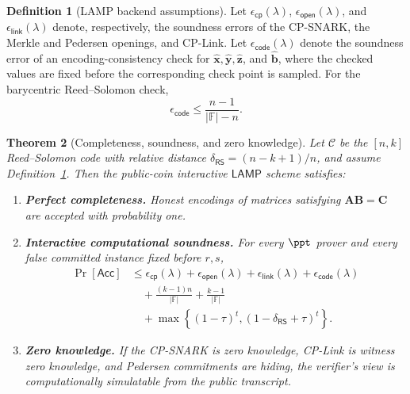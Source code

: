 \documentclass[conference,compsoc]{IEEEtran}
\newif\ifshowrevisions
\newenvironment{revblock}[1][]
  {%
    \ifshowrevisions
      \begin{tcolorbox}[
        breakable,
        colback=revisionyellow,
        colframe=revisionyellow,
        boxrule=0pt,
        arc=0pt,
        left=2pt,
        right=2pt,
        top=2pt,
        bottom=2pt,
        before skip=2pt,
        after skip=2pt,
        #1
      ]
    \fi
  }
  {%
    \ifshowrevisions
      \end{tcolorbox}
    \fi
  }
\newcommand{\mat}{\mathbf}          %
\newcommand{\vect}{\mathbf}         %
\newcommand{\protocol}{\textsf{LAMP}}   %
\theoremstyle{plain}
\newtheorem{theorem}{Theorem}[section]
\theoremstyle{definition}
\newtheorem{definition}[theorem]{Definition}
\theoremstyle{remark}
\begin{document}
\begin{revblock}
\begin{definition}[LAMP backend assumptions]
\label{def:lamp-backend-assumptions}
Let \(\epsilon_{\mathsf{cp}}(\lambda)\),
\(\epsilon_{\mathsf{open}}(\lambda)\), and
\(\epsilon_{\mathsf{link}}(\lambda)\) denote, respectively, the soundness
errors of the CP-SNARK, the Merkle and Pedersen openings, and CP-Link. Let \(\epsilon_{\mathsf{code}}(\lambda)\) denote the soundness error of an
  encoding-consistency check for
  \(\widehat{\vect{x}},\widehat{\vect{y}},\widehat{\vect{z}}\), and
  \(\widehat{\vect{b}}\), where the checked values are fixed before the
  corresponding check point is sampled. For the barycentric Reed--Solomon check,
  \[
  \epsilon_{\mathsf{code}}
  \leq \frac{n-1}{|\mathbb{F}|-n}.
  \]
\end{definition}

\begin{theorem}[Completeness, soundness, and zero knowledge]
\label{thm:security}
Let \(\mathcal C\) be the \([n,k]\) Reed--Solomon code with relative distance
\(\delta_{\mathsf{RS}}=(n-k+1)/n\), and assume
Definition~\ref{def:lamp-backend-assumptions}.  Then the public-coin interactive
\(\protocol\) scheme satisfies:
\begin{enumerate}[label=(\roman*)]
  \item \textbf{Perfect completeness.}
  Honest encodings of matrices satisfying
  \(\mat A\mat B=\mat C\) are accepted with probability one.

  \item \textbf{Interactive computational soundness.}
  For every \(\ppt\) prover and every false committed instance fixed before
  \(r,s\),
  \[
  \begin{aligned}
  \Pr[\mathsf{Acc}]
  &\le
    \epsilon_{\mathsf{cp}}(\lambda)
   +\epsilon_{\mathsf{open}}(\lambda)
   +\epsilon_{\mathsf{link}}(\lambda)
   +\epsilon_{\mathsf{code}}(\lambda)\\
  &\quad
   +\frac{(k-1)n}{|\mathbb F|}
   +\frac{k-1}{|\mathbb F|}\\
  &\quad
   +\max\!\left\{
      (1-\tau)^t,
      (1-\delta_{\mathsf{RS}}+\tau)^t
    \right\}.
  \end{aligned}
  \]

  \item \textbf{Zero knowledge.}
  If the CP-SNARK is zero knowledge, CP-Link is witness zero knowledge, and
  Pedersen commitments are hiding, the verifier's view is computationally
  simulatable from the public transcript.
\end{enumerate}
\end{theorem}


\end{revblock}
\end{document}
